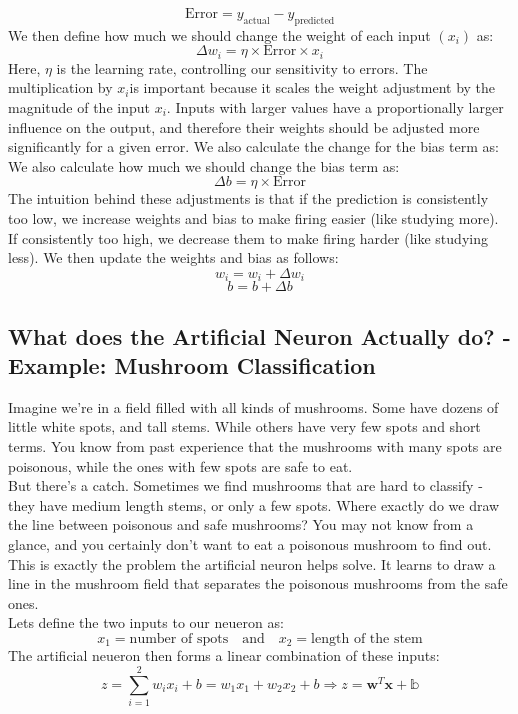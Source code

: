 \documentclass[9pt]{extarticle}
\begin{document}
$$\text{Error} = y_{\text{actual}} - y_{\text{predicted}}$$
We then define how much we should change the weight of each input $(x_i)$ as:
$$\Delta w_i = \eta \times \text{Error} \times x_i$$
Here, $\eta$ is the learning rate, controlling our sensitivity to errors.
The multiplication by $x_i$is important because it scales the weight adjustment by the magnitude of the input $x_i$.
Inputs with larger values have a proportionally larger influence on the output,
and therefore their weights should be adjusted more significantly for a given error.
We also calculate the change for the bias term as:
We also calculate how much we should change the bias term as:
$$\Delta b = \eta \times \text{Error}$$
The intuition behind these adjustments is that if the prediction is consistently too low, we increase weights and bias to make firing easier (like studying more).
If consistently too high, we decrease them to make firing harder (like studying less). We then update the weights and bias as follows:
$$w_i = w_i + \Delta w_i$$
$$b = b + \Delta b$$


\pagebreak

\subsection{What does the Artificial Neuron Actually do? - Example: Mushroom Classification}
Imagine we're in a field filled with all kinds of mushrooms. Some have dozens of little white spots, and tall stems. While others have very few spots and short terms.
You know from past experience that the mushrooms with many spots are poisonous, while the ones with few spots are safe to eat. \\[2ex]
But there's a catch. Sometimes we find mushrooms that are hard to classify - they have medium length stems, or only a few spots. Where exactly do we draw the line between poisonous and safe mushrooms? You may not know from a glance, and you
certainly don't want to eat a poisonous mushroom to find out. \\[2ex]
This is exactly the problem the artificial neuron helps solve. It learns to draw a line in the mushroom field that separates the poisonous mushrooms from the safe ones.\\
Lets define the two inputs to our neueron as:
$$x_1 = \text{number of spots} \quad \text{and} \quad x_2 = \text{length of the stem}$$
The artificial neueron then forms a linear combination of these inputs:
$$z = \sum_{i=1}^{2} w_i x_i + b = w_1 x_1 + w_2 x_2 + b \Rightarrow z = \mathbf{w}^T \mathbf{x} + \mathbb{b}$$
\end{document}

